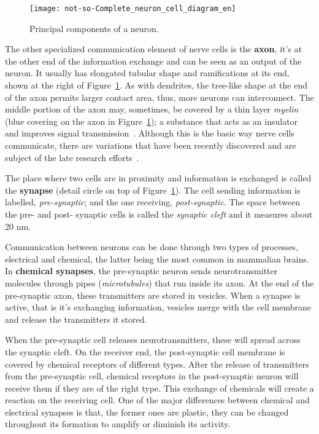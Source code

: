 \begin{figure}
  \begin{center}
    \texttt{[image: not-so-Complete\_neuron\_cell\_diagram\_en]}
    \caption{Principal components of a neuron.}
    \label{fig:neuro:neuron-anatomy}
  \end{center}
\end{figure}

The other specialized communication element of nerve cells is the \textbf{axon}, it's at the other end of the information exchange and can be seen as an output of the neuron. It usually has elongated tubular shape and ramifications at its end, shown at the right of Figure~\ref{fig:neuro:neuron-anatomy}. As with dendrites, the tree-like shape at the end of the axon permits larger contact area, thus, more neurons can interconnect. The middle portion of the axon may, sometimes, be covered by a thin layer \emph{myelin} (blue covering on the axon in Figure~\ref{fig:neuro:neuron-anatomy}); a substance that acts as an insulator and improves signal transmission~\cite{thompson2000brain}. Although this is the basic way nerve cells communicate, there are variations that have been recently discovered and are subject of the late research efforts~\cite{Bullock04112005}.

The place where two cells are in proximity and information is exchanged is called the \textbf{synapse} (detail circle on top of Figure~\ref{fig:neuro:neuron-anatomy}). The cell sending information is labelled, \emph{pre-synaptic}; and the one receiving, \emph{post-synaptic}. The space between the pre- and post- synaptic cells is called the \emph{synaptic cleft} and it measures about 20 nm. 

Communication between neurons can be done through two types of processes, electrical and chemical, the latter being the most common in mammalian brains. In \textbf{chemical synapses}, the pre-synaptic neuron sends neurotransmitter molecules through pipes (\emph{microtubules}) that run inside its axon. At the end of the pre-synaptic axon, these transmitters are stored in vesicles. When a synapse is active, that is it's exchanging information, vesicles merge with the cell membrane and release the transmitters it stored.

When the pre-synaptic cell releases neurotransmitters, these will spread across the synaptic cleft. On the receiver end, the post-synaptic cell membrane is covered by chemical receptors of different types. After the release of transmitters from the pre-synaptic cell, chemical receptors in the post-synaptic neuron will receive them if they are of the right type. This exchange of chemicals will create a reaction on the receiving cell. One of the major differences between chemical and electrical synapses is that, the former ones are plastic, they can be changed throughout its formation to amplify or diminish its activity.

